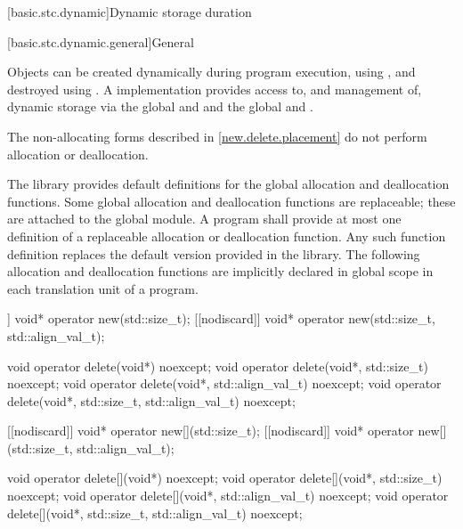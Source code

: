 [basic.stc.dynamic]{Dynamic storage duration}%

[basic.stc.dynamic.general]{General}%

\pnum
Objects can be created dynamically during program
execution, using
%
, and destroyed using
%
. A \Cpp{} implementation
provides access to, and management of, dynamic storage via
the global 
 and
 and
the global 
 and
.
\begin{note}
The non-allocating forms described in \ref{new.delete.placement}
do not perform allocation or deallocation.
\end{note}

\pnum
The library provides default definitions for the global allocation and
deallocation functions. Some global allocation and deallocation
functions are replaceable;
these are attached to the global module.
A \Cpp{} program shall
provide at most one definition of a replaceable allocation or
deallocation function. Any such function definition replaces the default
version provided in the library. The
following allocation and deallocation functions
are implicitly declared in global scope in each translation unit of a
program.

\begin{codeblock}
[[nodiscard]] void* operator new(std::size_t);
[[nodiscard]] void* operator new(std::size_t, std::align_val_t);

void operator delete(void*) noexcept;
void operator delete(void*, std::size_t) noexcept;
void operator delete(void*, std::align_val_t) noexcept;
void operator delete(void*, std::size_t, std::align_val_t) noexcept;

[[nodiscard]] void* operator new[](std::size_t);
[[nodiscard]] void* operator new[](std::size_t, std::align_val_t);

void operator delete[](void*) noexcept;
void operator delete[](void*, std::size_t) noexcept;
void operator delete[](void*, std::align_val_t) noexcept;
void operator delete[](void*, std::size_t, std::align_val_t) noexcept;
\end{codeblock}

